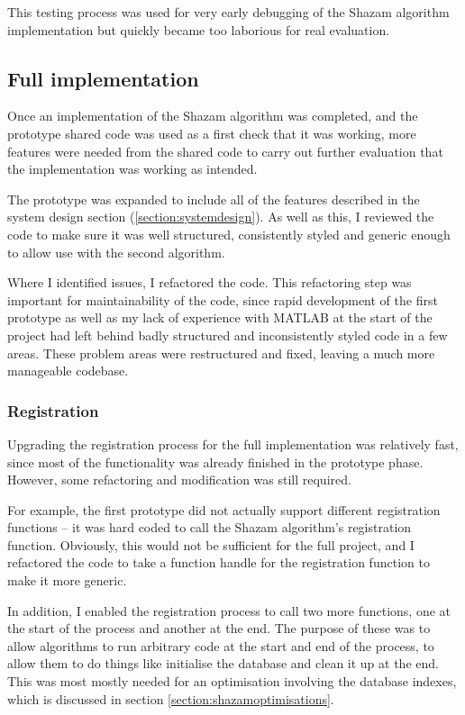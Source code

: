 \documentclass[12pt,a4paper,twoside,openright]{report}
\begin{document}
This testing process was used for very early debugging of the Shazam algorithm implementation but quickly became too laborious for real evaluation.


\subsection{Full implementation}

Once an implementation of the Shazam algorithm was completed, and the prototype shared code was used as a first check that it was working, more features were needed from the shared code to carry out further evaluation that the implementation was working as intended.

The prototype was expanded to include all of the features described in the system design section (\ref{section:systemdesign}). As well as this, I reviewed the code to make sure it was well structured, consistently styled and generic enough to allow use with the second algorithm. 

Where I identified issues, I refactored the code. This refactoring step was important for maintainability of the code, since rapid development of the first prototype as well as my lack of experience with MATLAB at the start of the project had left behind badly structured and inconsistently styled code in a few areas. These problem areas were restructured and fixed, leaving a much more manageable codebase.


\subsubsection{Registration}

Upgrading the registration process for the full implementation was relatively fast, since most of the functionality was already finished in the prototype phase. However, some refactoring and modification was still required.

For example, the first prototype did not actually support different registration functions -- it was hard coded to call the Shazam algorithm's registration function. Obviously, this would not be sufficient for the full project, and I refactored the code to take a function handle for the registration function to make it more generic.

In addition, I enabled the registration process to call two more functions, one at the start of the process and another at the end. The purpose of these was to allow algorithms to run arbitrary code at the start and end of the process, to allow them to do things like initialise the database and clean it up at the end. This was most mostly needed for an optimisation involving the database indexes, which is discussed in section \ref{section:shazamoptimisations}.
\end{document}
